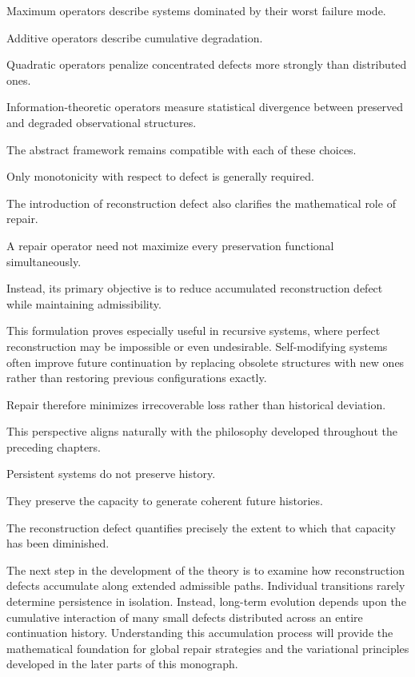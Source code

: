 \documentclass[11pt]{book}
\numberwithin{equation}{chapter}
\theoremstyle{definition}
\theoremstyle{plain}
\begin{document}
Maximum operators describe systems dominated by their worst failure mode.

Additive operators describe cumulative degradation.

Quadratic operators penalize concentrated defects more strongly than distributed ones.

Information-theoretic operators measure statistical divergence between preserved and degraded observational structures.

The abstract framework remains compatible with each of these choices.

Only monotonicity with respect to defect is generally required.

The introduction of reconstruction defect also clarifies the mathematical role of repair.

A repair operator need not maximize every preservation functional simultaneously.

Instead, its primary objective is to reduce accumulated reconstruction defect while maintaining admissibility.

This formulation proves especially useful in recursive systems, where perfect reconstruction may be impossible or even undesirable. Self-modifying systems often improve future continuation by replacing obsolete structures with new ones rather than restoring previous configurations exactly.

Repair therefore minimizes irrecoverable loss rather than historical deviation.

This perspective aligns naturally with the philosophy developed throughout the preceding chapters.

Persistent systems do not preserve history.

They preserve the capacity to generate coherent future histories.

The reconstruction defect quantifies precisely the extent to which that capacity has been diminished.

The next step in the development of the theory is to examine how reconstruction defects accumulate along extended admissible paths. Individual transitions rarely determine persistence in isolation. Instead, long-term evolution depends upon the cumulative interaction of many small defects distributed across an entire continuation history. Understanding this accumulation process will provide the mathematical foundation for global repair strategies and the variational principles developed in the later parts of this monograph.
\end{document}

